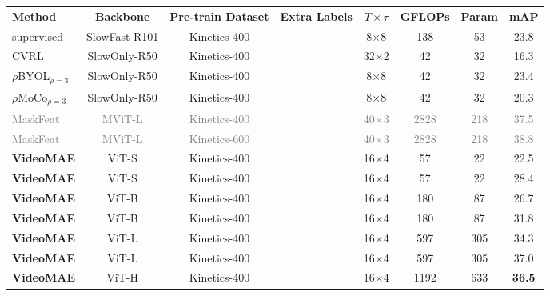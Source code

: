 \documentclass{article}
\newcommand{\cmark}{\ding{51}}%
\newcommand{\xmark}{\ding{55}}%
\def\x{$\times$}
\newcommand{\tablestyle}[2]{\setlength{\tabcolsep}{#1}\renewcommand{\arraystretch}{#2}\centering\footnotesize}
\begin{document}
\begin{table}[t]
	\centering
	\tablestyle{2pt}{1.05}
    \begin{tabular}{l|c|c|c|c|c|c|c}
		\textbf{Method} &  \textbf{Backbone} & \textbf{Pre-train Dataset} & \textbf{Extra Labels} & \textbf{$T \times \tau$} &  \textbf{GFLOPs}  & \textbf{Param} & \textbf{mAP}   \\ 
		\shline
        \rowcolor{mygray} supervised~\cite{slowfast} & SlowFast-R101 & Kinetics-400 & \cmark & 8\x8 & 138 & 53 & 23.8 \\
        CVRL~\cite{cvrl} & SlowOnly-R50  & Kinetics-400 & \xmark & 32\x2 & 42 &  32  &  16.3 \\
        $\rho$BYOL$_{\rho=3}$~\cite{large} & SlowOnly-R50 & Kinetics-400 & \xmark & 8\x8 & 42 &  32  & 23.4 \\
        $\rho$MoCo$_{\rho=3}$~\cite{large} & SlowOnly-R50 & Kinetics-400 & \xmark & 8\x8 & 42 &  32  & 20.3 \\
        \textcolor{gray}{MaskFeat{\scriptsize\textuparrow312}~\cite{wei2021masked}} & \textcolor{gray}{MViT-L} & \textcolor{gray}{Kinetics-400} & \textcolor{gray}{\cmark} & \textcolor{gray}{40\x3} & \textcolor{gray}{2828} &  \textcolor{gray}{218} & \textcolor{gray}{37.5}  \\
		\textcolor{gray}{MaskFeat{\scriptsize\textuparrow312}~\cite{wei2021masked}} & \textcolor{gray}{MViT-L} & \textcolor{gray}{Kinetics-600} & \textcolor{gray}{\cmark} & \textcolor{gray}{40\x3} & \textcolor{gray}{2828} &  \textcolor{gray}{218} & \textcolor{gray}{38.8}  \\
        \shline
        \textbf{VideoMAE} & ViT-S & Kinetics-400 & \xmark & 16\x4 & 57 & 22 & 22.5 \\		\textbf{VideoMAE} & ViT-S & Kinetics-400 & \cmark & 16\x4 & 57 & 22 & 28.4 \\
        \textbf{VideoMAE} & ViT-B & Kinetics-400 & \xmark & 16\x4 & 180 & 87 & 26.7 \\
        \textbf{VideoMAE} & ViT-B & Kinetics-400 & \cmark & 16\x4 & 180 & 87 & 31.8 \\
        \textbf{VideoMAE} & ViT-L & Kinetics-400 & \xmark & 16\x4 & 597 & 305 & 34.3 \\
        \textbf{VideoMAE} & ViT-L & Kinetics-400 & \cmark & 16\x4 & 597 & 305 & 37.0 \\
        \textbf{VideoMAE} & ViT-H & Kinetics-400 & \xmark & 16\x4 & 1192 & 633 & \textbf{36.5} \\

\end{tabular}
\end{table}
\end{document}
